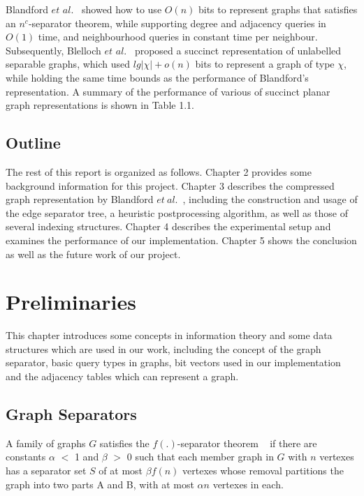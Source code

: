 \documentclass[12pt,glossary]{dalthesis}
\begin{document}
\bigskip

Blandford $et$ $al.$~\cite{compact-representation} showed how to use $O(n)$ bits to represent graphs that satisfies an $n^{c}$-separator theorem, while supporting degree and adjacency queries in $O(1)$ time, and neighbourhood queries in constant time per neighbour. Subsequently, Blelloch $et$ $al.$~\cite{succinct-representation} proposed a succinct representation of unlabelled separable graphs, which used $lg| \chi |+ o(n)$ bits to represent a graph of type $\chi$, while holding the same time bounds as the performance of Blandford's representation. A summary of the performance of various of succinct planar graph representations is shown in Table 1.1.
        

\section{Outline}
The rest of this report is organized as follows. Chapter 2 provides some background information for this project. Chapter 3 describes the compressed graph representation by Blandford $et \ al.$~\cite{compact-representation}, including the construction and usage of the edge separator tree, a heuristic postprocessing algorithm, as well as those of several indexing structures. Chapter 4 describes the experimental setup and examines the performance of our implementation. Chapter 5 shows the conclusion as well as the future work of our project.


\chapter{Preliminaries}

This chapter introduces some concepts in information theory and some data structures which are used in our work, including the concept of the graph separator, basic query types in graphs, bit vectors used in our implementation and the adjacency tables which can represent a graph.

\section{Graph Separators}
A family of graphs $G$ satisfies the $f(.)$-separator theorem ~\cite{separator-theorem} if there are constants $\alpha$ $<$ 1 and $\beta$ $>$ 0 such that each member graph in $G$ with $n$ vertexes has a separator set $S$ of at most $\beta f(n)$ vertexes whose removal partitions the graph into two parts A and B, with at most $\alpha n$ vertexes in each.
\end{document}
